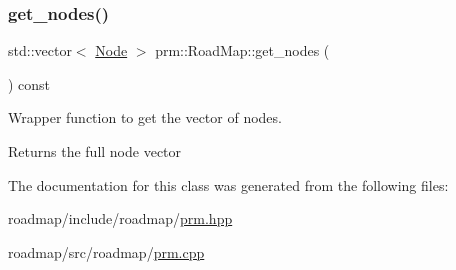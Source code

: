 \subsubsection{\texorpdfstring{get\+\_\+nodes()}{get\_nodes()}}
{\footnotesize\ttfamily std\+::vector$<$ \hyperlink{structprm_1_1Node}{Node} $>$ prm\+::\+Road\+Map\+::get\+\_\+nodes (\begin{DoxyParamCaption}{ }\end{DoxyParamCaption}) const}



Wrapper function to get the vector of nodes. 

\begin{DoxyReturn}{Returns}
the full node vector 
\end{DoxyReturn}


The documentation for this class was generated from the following files\+:\begin{DoxyCompactItemize}
\item 
roadmap/include/roadmap/\hyperlink{prm_8hpp}{prm.\+hpp}\item 
roadmap/src/roadmap/\hyperlink{prm_8cpp}{prm.\+cpp}\end{DoxyCompactItemize}
